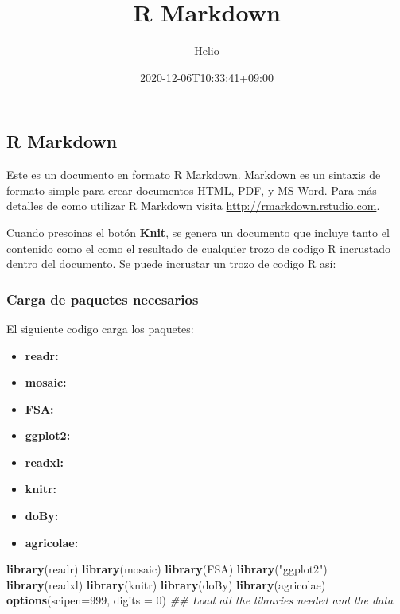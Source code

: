 \documentclass[]{article}
\title{R Markdown}
\author{Helio}
\date{2020-12-06T10:33:41+09:00}
\newenvironment{Shaded}{\begin{snugshade}}{\end{snugshade}}
\newcommand{\CommentTok}[1]{\textcolor[rgb]{0.56,0.35,0.01}{\textit{#1}}}
\newcommand{\DataTypeTok}[1]{\textcolor[rgb]{0.13,0.29,0.53}{#1}}
\newcommand{\DecValTok}[1]{\textcolor[rgb]{0.00,0.00,0.81}{#1}}
\newcommand{\KeywordTok}[1]{\textcolor[rgb]{0.13,0.29,0.53}{\textbf{#1}}}
\newcommand{\NormalTok}[1]{#1}
\newcommand{\StringTok}[1]{\textcolor[rgb]{0.31,0.60,0.02}{#1}}
\providecommand{\tightlist}{%
  \setlength{\itemsep}{0pt}\setlength{\parskip}{0pt}}
\begin{document}
\maketitle

\hypertarget{r-markdown}{%
\subsection{R Markdown}\label{r-markdown}}

Este es un documento en formato R Markdown. Markdown es un sintaxis de
formato simple para crear documentos HTML, PDF, y MS Word. Para más
detalles de como utilizar R Markdown visita
\url{http://rmarkdown.rstudio.com}.

Cuando presoinas el botón \textbf{Knit}, se genera un documento que
incluye tanto el contenido como el como el resultado de cualquier trozo
de codigo R incrustado dentro del documento. Se puede incrustar un trozo
de codigo R así:

\hypertarget{carga-de-paquetes-necesarios}{%
\subsubsection{Carga de paquetes
necesarios}\label{carga-de-paquetes-necesarios}}

El siguiente codigo carga los paquetes:

\begin{itemize}
\tightlist
\item
  \textbf{readr:}
\item
  \textbf{mosaic:}
\item
  \textbf{FSA:}
\item
  \textbf{ggplot2:}
\item
  \textbf{readxl:}
\item
  \textbf{knitr:}
\item
  \textbf{doBy:}
\item
  \textbf{agricolae:}
\end{itemize}

\begin{Shaded}
\begin{Highlighting}[]
\KeywordTok{library}\NormalTok{(readr)}
\KeywordTok{library}\NormalTok{(mosaic)}
\KeywordTok{library}\NormalTok{(FSA)}
\KeywordTok{library}\NormalTok{(}\StringTok{"ggplot2"}\NormalTok{)}
\KeywordTok{library}\NormalTok{(readxl)}
\KeywordTok{library}\NormalTok{(knitr)}
\KeywordTok{library}\NormalTok{(doBy)}
\KeywordTok{library}\NormalTok{(agricolae)}
\KeywordTok{options}\NormalTok{(}\DataTypeTok{scipen=}\DecValTok{999}\NormalTok{, }\DataTypeTok{digits =} \DecValTok{0}\NormalTok{)}
\CommentTok{## Load all the libraries needed and the data}
\end{Highlighting}
\end{Shaded}
\end{document}
